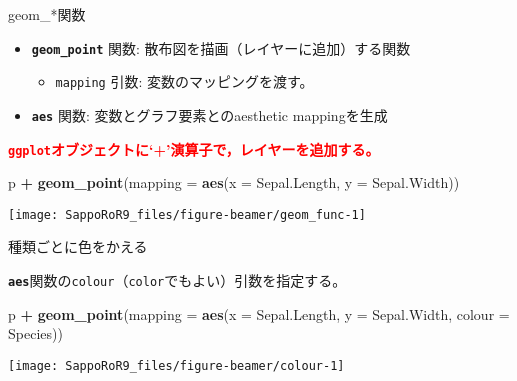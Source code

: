 \documentclass[ignorenonframetext,]{beamer}
\newenvironment{Shaded}{\begin{snugshade}}{\end{snugshade}}
\newcommand{\KeywordTok}[1]{\textcolor[rgb]{0.13,0.29,0.53}{\textbf{#1}}}
\newcommand{\DataTypeTok}[1]{\textcolor[rgb]{0.13,0.29,0.53}{#1}}
\newcommand{\StringTok}[1]{\textcolor[rgb]{0.31,0.60,0.02}{#1}}
\newcommand{\OperatorTok}[1]{\textcolor[rgb]{0.81,0.36,0.00}{\textbf{#1}}}
\newcommand{\NormalTok}[1]{#1}
\providecommand{\tightlist}{%
  \setlength{\itemsep}{0pt}\setlength{\parskip}{0pt}}
\let\oldShaded\Shaded
\let\endoldShaded\endShaded
\renewenvironment{Shaded}{\footnotesize\oldShaded}{\endoldShaded}
\begin{document}
\begin{frame}[fragile]{geom\_*関数}

\begin{itemize}
\tightlist
\item
  \textbf{\texttt{geom\_point}} 関数:
  散布図を描画（レイヤーに追加）する関数

  \begin{itemize}
  \tightlist
  \item
    \texttt{mapping} 引数: 変数のマッピングを渡す。
  \end{itemize}
\item
  \textbf{\texttt{aes}} 関数: 変数とグラフ要素とのaesthetic
  mappingを生成
\end{itemize}

\textcolor{red}{\bfseries \texttt{ggplot}オブジェクトに`+'演算子で，レイヤーを追加する。}

\begin{Shaded}
\begin{Highlighting}[]
\NormalTok{p }\OperatorTok{+}\StringTok{ }\KeywordTok{geom_point}\NormalTok{(}\DataTypeTok{mapping =} \KeywordTok{aes}\NormalTok{(}\DataTypeTok{x =}\NormalTok{ Sepal.Length, }\DataTypeTok{y =}\NormalTok{ Sepal.Width))}
\end{Highlighting}
\end{Shaded}

\texttt{[image: SappoRoR9\_files/figure-beamer/geom\_func-1]}

\end{frame}

\begin{frame}[fragile]{種類ごとに色をかえる}

\textbf{\texttt{aes}}関数の\texttt{colour}（\texttt{color}でもよい）引数を指定する。

\begin{Shaded}
\begin{Highlighting}[]
\NormalTok{p }\OperatorTok{+}\StringTok{ }\KeywordTok{geom_point}\NormalTok{(}\DataTypeTok{mapping =} \KeywordTok{aes}\NormalTok{(}\DataTypeTok{x =}\NormalTok{ Sepal.Length, }\DataTypeTok{y =}\NormalTok{ Sepal.Width,}
                             \DataTypeTok{colour =}\NormalTok{ Species))}
\end{Highlighting}
\end{Shaded}

\texttt{[image: SappoRoR9\_files/figure-beamer/colour-1]}

\end{frame}
\end{document}
